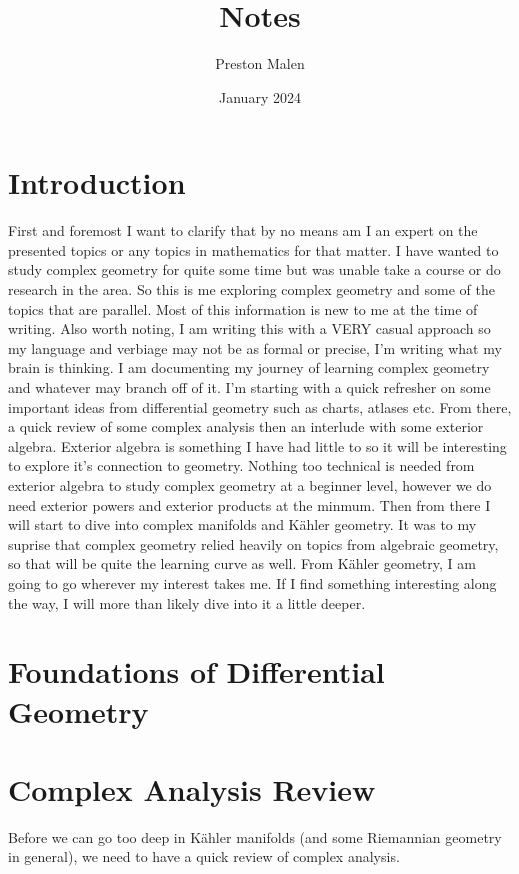\documentclass[12pt, letterpaper]{article}
\title{Notes}
\author{Preston Malen}
\date{January 2024}
\begin{document}
\maketitle
\thispagestyle{empty}

\newpage
\thispagestyle{empty}
\section*{Introduction}
First and foremost I want to clarify that by no means am I an expert on the presented
topics or any topics in mathematics for that matter. I have wanted to study complex
geometry for quite some time but was unable take a course or do research in the area.
So this is me exploring complex geometry and some of the topics that are parallel.
Most of this information is new to me at the time of writing. Also worth noting,
I am writing this with a VERY casual approach so my language and verbiage may not be
as formal or precise, I'm writing what my brain is thinking. I am documenting my
journey of learning complex geometry and whatever may branch off of it. I'm starting
with a quick refresher on some important ideas from differential geometry such as
charts, atlases etc. From there, a quick review of some complex analysis then an
interlude with some exterior algebra. Exterior algebra is something I have had
little to so it will be interesting to explore it's connection to geometry.
Nothing too technical is needed from exterior algebra to study complex geometry at a beginner
level, however we do need exterior powers and exterior products at the minmum. Then
from there I will start to dive into complex manifolds and Kähler geometry. It was
to my suprise that complex geometry relied heavily on topics from algebraic geometry,
so that will be quite the learning curve as well. From Kähler geometry, I am going
to go wherever my interest takes me. If I find something interesting along the way,
I will more than likely dive into it a little deeper.

\newpage
\thispagestyle{empty}
\tableofcontents


\newpage
\clearpage




\newpage

\section{Foundations of Differential Geometry}


\section{Complex Analysis Review}
Before we can go too deep in Kähler manifolds (and some Riemannian geometry in
general), we need to have a quick review of complex analysis.
\end{document}
